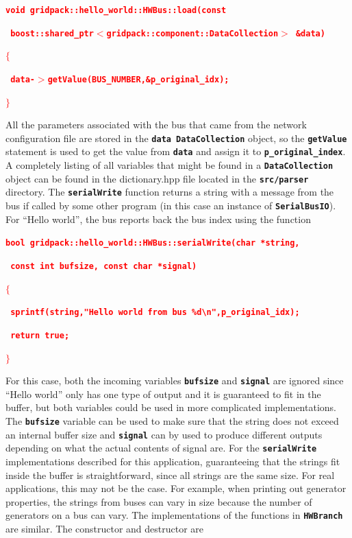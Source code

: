 \documentclass[12pt]{report} %
\begin{document}
\textcolor{red}{\texttt{\textbf{void gridpack::hello\_world::HWBus::load(const}}}

\textcolor{red}{\texttt{\textbf{     boost::shared\_ptr$\boldsymbol{\mathrm{<}}$gridpack::component::DataCollection$\boldsymbol{\mathrm{>}}$ \&data)}}}

\textcolor{red}{\texttt{\textbf{$\boldsymbol{\mathrm{\{}}$}}}

\textcolor{red}{\texttt{\textbf{   data-$\boldsymbol{\mathrm{>}}$getValue(BUS\_NUMBER,\&p\_original\_idx);}}}

\textcolor{red}{\texttt{\textbf{$\boldsymbol{\mathrm{\}}}$}}}

All the parameters associated with the bus that came from the network configuration file are stored in the \texttt{\textbf{data DataCollection}} object, so the \texttt{\textbf{getValue}} statement is used to get the value from \texttt{\textbf{data}} and assign it to \texttt{\textbf{p\_original\_index}}. A completely listing of all variables that might be found in a \texttt{\textbf{DataCollection}} object can be found in the dictionary.hpp file located in the \texttt{\textbf{src/parser}} directory.
The \texttt{\textbf{serialWrite}} function returns a string with a message from the bus if called by some other program (in this case an instance of \texttt{\textbf{SerialBusIO}}). For ``Hello world'', the bus reports back the bus index using the function

\textcolor{red}{\texttt{\textbf{bool gridpack::hello\_world::HWBus::serialWrite(char *string,}}}

\textcolor{red}{\texttt{\textbf{        const int bufsize, const char *signal)}}}

\textcolor{red}{\texttt{\textbf{$\boldsymbol{\mathrm{\{}}$}}}

\textcolor{red}{\texttt{\textbf{  sprintf(string,"Hello world from bus \%d{\textbackslash}n",p\_original\_idx);}}}

\textcolor{red}{\texttt{\textbf{  return true;}}}

\textcolor{red}{\texttt{\textbf{$\boldsymbol{\mathrm{\}}}$}}}

For this case, both the incoming variables \texttt{\textbf{bufsize}} and \texttt{\textbf{signal}} are ignored since ``Hello world'' only has one type of output and it is guaranteed to fit in the buffer, but both variables could be used in more complicated implementations. The \texttt{\textbf{bufsize}} variable can be used to make sure that the string does not exceed an internal buffer size and \texttt{\textbf{signal}} can by used to produce different outputs depending on what the actual contents of signal are. For the \texttt{\textbf{serialWrite}} implementations described for this application, guaranteeing that the strings fit inside the buffer  is straightforward, since all strings are the same size. For real applications, this may not be the case. For example, when printing out generator properties, the strings from buses can vary in size because the number of generators on a bus can vary.
The implementations of the functions in \texttt{\textbf{HWBranch}} are similar. The constructor and destructor are
\end{document}
